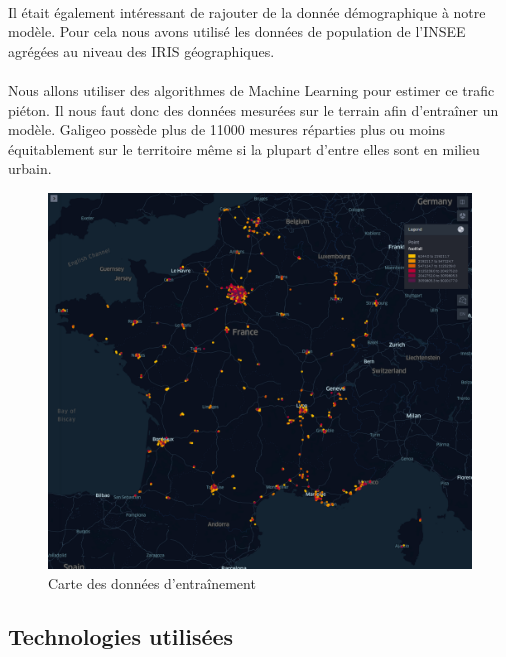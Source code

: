 \paragraph*{}

Il était également intéressant de rajouter de la donnée démographique à notre modèle. Pour cela nous avons utilisé les données de population de l'INSEE agrégées au niveau des IRIS géographiques.

\paragraph*{}

Nous allons utiliser des algorithmes de Machine Learning pour estimer ce trafic piéton. Il nous faut donc des données mesurées sur le terrain afin d'entraîner un modèle. Galigeo possède plus de 11000 mesures réparties plus ou moins équitablement sur le territoire même si la plupart d'entre elles sont en milieu urbain.

\begin{figure}[H]
    \centering
    \includegraphics[width=\linewidth]{images/graphs/map_of_label_footfall.png}
    \caption{Carte des données d'entraînement}
    \label{fig:footfallmap}
\end{figure}

\subsection{Technologies utilisées}

